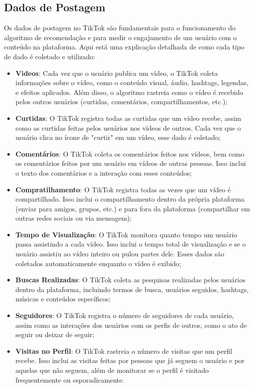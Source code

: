 \subsection{Dados de Postagem}

Os dados de postagem no TikTok são fundamentais para o funcionamento do algoritmo de recomendação e para medir o engajamento de um usuário com o conteúdo na plataforma. Aqui está uma explicação detalhada de como cada tipo de dado é coletado e utilizado:

\begin{itemize}
    \item \textbf{Videos}: Cada vez que o usuário publica um vídeo, o TikTok coleta informações sobre o vídeo, como o conteúdo visual, áudio, hashtags, legendas, e efeitos aplicados. Além disso, o algoritmo rastreia como o vídeo é recebido pelos outros usuários (curtidas, comentários, compartilhamentos, etc.);
    \item \textbf{Curtidas}: O TikTok registra todas as curtidas que um vídeo recebe, assim como as curtidas feitas pelos usuários nos vídeos de outros. Cada vez que o usuário clica no ícone de "curtir" em um vídeo, esse dado é coletado;
    \item \textbf{Comentários}: O TikTok coleta os comentários feitos nos vídeos, bem como os comentários feitos por um usuário em vídeos de outras pessoas. Isso inclui o texto dos comentários e a interação com esses conteúdos;
    \item \textbf{Compratilhamento}: O TikTok registra todas as vezes que um vídeo é compartilhado. Isso inclui o compartilhamento dentro da própria plataforma (enviar para amigos, grupos, etc.) e para fora da plataforma (compartilhar em outras redes sociais ou via mensagem);
    \item \textbf{Tempo de Visualização}: O TikTok monitora quanto tempo um usuário passa assistindo a cada vídeo. Isso inclui o tempo total de visualização e se o usuário assistiu ao vídeo inteiro ou pulou partes dele. Esses dados são coletados automaticamente enquanto o vídeo é exibido;
    \item  \textbf{Buscas Realizadas}: O TikTok coleta as pesquisas realizadas pelos usuários dentro da plataforma, incluindo termos de busca, usuários seguidos, hashtags, músicas e conteúdos específicos;
    \item \textbf{Seguidores}: O TikTok registra o número de seguidores de cada usuário, assim como as interações dos usuários com os perfis de outros, como o ato de seguir ou deixar de seguir;
    \item  \textbf{Visitas no Perfil}: O TikTok rastreia o número de visitas que um perfil recebe. Isso inclui as visitas feitas por pessoas que já seguem o usuário e por aquelas que não seguem, além de monitorar se o perfil é visitado frequentemente ou esporadicamente.
\end{itemize}



